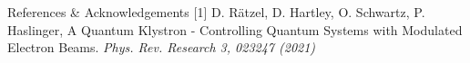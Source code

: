 \documentclass[final]{beamer}
\begin{document}
\begin{frame}[fragile]{}
\begin{columns}[T]
\begin{column}{.49\linewidth}
%
%

      \begin{block}{\Large References \& Acknowledgements}
        [1] D. Rätzel, D. Hartley, O. Schwartz, P. Haslinger, A Quantum
        Klystron - Controlling Quantum Systems with Modulated Electron Beams.
        \textit{Phys. Rev. Research 3, 023247 (2021)}
      \end{block}


\end{column}
\end{columns}
\end{frame}
\end{document}
